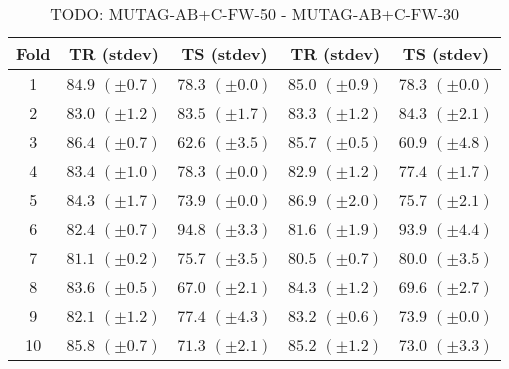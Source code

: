 \documentclass[10pt,a4paper]{book}
\begin{document}
\begin{table}[tbph]
\caption{TODO: MUTAG-AB+C-FW-50 - MUTAG-AB+C-FW-30}
\label{TODO}
\centering
\begin{tabular}{c*{4}{c}}
\toprule
Fold & TR (stdev) & TS (stdev) & TR (stdev) & TS (stdev)\\
\midrule
1 & $84.9$ $(\pm 0.7)$ & $78.3$ $(\pm 0.0)$ & $85.0$ $(\pm 0.9)$ & $78.3$ $(\pm 0.0)$\\
2 & $83.0$ $(\pm 1.2)$ & $83.5$ $(\pm 1.7)$ & $83.3$ $(\pm 1.2)$ & $84.3$ $(\pm 2.1)$\\
3 & $86.4$ $(\pm 0.7)$ & $62.6$ $(\pm 3.5)$ & $85.7$ $(\pm 0.5)$ & $60.9$ $(\pm 4.8)$\\
4 & $83.4$ $(\pm 1.0)$ & $78.3$ $(\pm 0.0)$ & $82.9$ $(\pm 1.2)$ & $77.4$ $(\pm 1.7)$\\
5 & $84.3$ $(\pm 1.7)$ & $73.9$ $(\pm 0.0)$ & $86.9$ $(\pm 2.0)$ & $75.7$ $(\pm 2.1)$\\
6 & $82.4$ $(\pm 0.7)$ & $94.8$ $(\pm 3.3)$ & $81.6$ $(\pm 1.9)$ & $93.9$ $(\pm 4.4)$\\
7 & $81.1$ $(\pm 0.2)$ & $75.7$ $(\pm 3.5)$ & $80.5$ $(\pm 0.7)$ & $80.0$ $(\pm 3.5)$\\
8 & $83.6$ $(\pm 0.5)$ & $67.0$ $(\pm 2.1)$ & $84.3$ $(\pm 1.2)$ & $69.6$ $(\pm 2.7)$\\
9 & $82.1$ $(\pm 1.2)$ & $77.4$ $(\pm 4.3)$ & $83.2$ $(\pm 0.6)$ & $73.9$ $(\pm 0.0)$\\
10 & $85.8$ $(\pm 0.7)$ & $71.3$ $(\pm 2.1)$ & $85.2$ $(\pm 1.2)$ & $73.0$ $(\pm 3.3)$\\
\bottomrule
\end{tabular}
\end{table}


\end{document}
